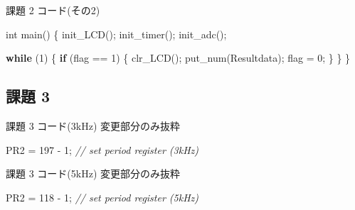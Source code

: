 \documentclass[9pt,a4paper,]{ltjsarticle}
\newenvironment{Shaded}{}{}
\newcommand{\CommentTok}[1]{\textcolor[rgb]{0.38,0.63,0.69}{\textit{#1}}}
\newcommand{\ControlFlowTok}[1]{\textcolor[rgb]{0.00,0.44,0.13}{\textbf{#1}}}
\newcommand{\DataTypeTok}[1]{\textcolor[rgb]{0.56,0.13,0.00}{#1}}
\newcommand{\DecValTok}[1]{\textcolor[rgb]{0.25,0.63,0.44}{#1}}
\newcommand{\NormalTok}[1]{#1}
\begin{document}
\begin{codelisting}

\caption{課題 2 コード(その2)}

\hypertarget{lst:awesome-code}{%
\label{lst:awesome-code}}%
\begin{Shaded}
\begin{Highlighting}[numbers=left,,]
\DataTypeTok{int}\NormalTok{ main() \{}
\NormalTok{  init_LCD();}
\NormalTok{  init_timer();}
\NormalTok{  init_adc();}

  \ControlFlowTok{while}\NormalTok{ (}\DecValTok{1}\NormalTok{) \{}
    \ControlFlowTok{if}\NormalTok{ (flag == }\DecValTok{1}\NormalTok{) \{}
\NormalTok{      clr_LCD();}
\NormalTok{      put_num(Resultdata);}
\NormalTok{      flag = }\DecValTok{0}\NormalTok{;}
\NormalTok{    \}}
\NormalTok{  \}}
\NormalTok{\}}
\end{Highlighting}
\end{Shaded}

\end{codelisting}

\hypertarget{ux8ab2ux984c-3}{%
\subsection{課題 3}\label{ux8ab2ux984c-3}}

\begin{codelisting}

\caption{課題 3 コード(3kHz) 変更部分のみ抜粋}

\hypertarget{lst:awesome-code}{%
\label{lst:awesome-code}}%
\begin{Shaded}
\begin{Highlighting}[numbers=left,,]
\NormalTok{PR2 = }\DecValTok{197}\NormalTok{ - }\DecValTok{1}\NormalTok{; }\CommentTok{// set period register (3kHz)}
\end{Highlighting}
\end{Shaded}

\end{codelisting}

\begin{codelisting}

\caption{課題 3 コード(5kHz) 変更部分のみ抜粋}

\hypertarget{lst:awesome-code}{%
\label{lst:awesome-code}}%
\begin{Shaded}
\begin{Highlighting}[numbers=left,,]
\NormalTok{PR2 = }\DecValTok{118}\NormalTok{ - }\DecValTok{1}\NormalTok{; }\CommentTok{// set period register (5kHz)}
\end{Highlighting}
\end{Shaded}

\end{codelisting}
\end{document}
